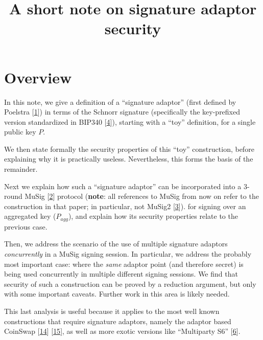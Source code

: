 \documentclass[10pt,a4paper]{article}
\begin{document}
\title{A short note on signature adaptor security}
\maketitle

\section{Overview}

In this note, we give a definition of a ``signature adaptor'' (first defined by Poelstra {[}\protect\hyperlink{anchor-1}{1}{]}) in terms of the Schnorr signature (specifically the key-prefixed version standardized in BIP340 {[}\protect\hyperlink{anchor-4}{4}{]}), starting with a ``toy'' definition, for a single public key $P$.

\vspace{5 pt}

We then state formally the security properties of this ``toy'' construction, before explaining why it is practically useless. Nevertheless, this forms the basis of the remainder.

\vspace{5 pt}

Next we explain how such a ``signature adaptor'' can be incorporated into a 3-round MuSig {[}\protect\hyperlink{anchor-2}{2}{]} protocol (\textbf{note}: all references to MuSig from now on refer to the construction in that paper; in particular, not MuSig2 {[}\protect\hyperlink{anchor-3}{3}{]}). for signing over an aggregated key ($P_{agg}$), and explain how its security properties relate to the previous case.

\vspace{5 pt}

Then, we address the scenario of the use of multiple signature adaptors  \emph{concurrently} in a MuSig signing session. In particular, we address the probably most important case: where the \emph{same} adaptor point (and therefore secret) is being used concurrently in multiple different signing sessions. We find that security of such a construction can be proved by a reduction argument, but only with some important caveats. Further work in this area is likely needed.

\vspace{5 pt}

This last analysis is useful because it applies to the most well known constructions that require signature adaptors, namely the adaptor based CoinSwap {[}\protect\hyperlink{anchor-14}{14}{]} {[}\protect\hyperlink{anchor-15}{15}{]}, as well as more exotic versions like ``Multiparty S6'' {[}\protect\hyperlink{anchor-6}{6}{]}.
\end{document}
